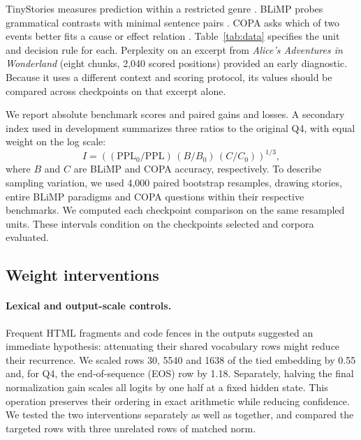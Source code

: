 \documentclass[11pt]{article}
\newcommand{\ppl}{\mathrm{PPL}}
\begin{document}
TinyStories measures prediction within a restricted genre \citep{tiny}. BLiMP probes grammatical contrasts with minimal sentence pairs \citep{blimp}. COPA asks which of two events better fits a cause or effect relation \citep{copa}. Table~\ref{tab:data} specifies the unit and decision rule for each. Perplexity on an excerpt from \emph{Alice's Adventures in Wonderland} (eight chunks, 2,040 scored positions) provided an early diagnostic. Because it uses a different context and scoring protocol, its values should be compared across checkpoints on that excerpt alone.

We report absolute benchmark scores and paired gains and losses. A secondary index used in development summarizes three ratios to the original Q4, with equal weight on the log scale:
\begin{equation}
 I=\left((\ppl_0/\ppl)\,(B/B_0)\,(C/C_0)\right)^{1/3},
 \label{eq:index}
\end{equation}
where $B$ and $C$ are BLiMP and COPA accuracy, respectively. To describe sampling variation, we used 4,000 paired bootstrap resamples, drawing stories, entire BLiMP paradigms and COPA questions within their respective benchmarks. We computed each checkpoint comparison on the same resampled units. These intervals condition on the checkpoints selected and corpora evaluated.

\subsection{Weight interventions}
\paragraph{Lexical and output-scale controls.}
Frequent HTML fragments and code fences in the outputs suggested an immediate hypothesis: attenuating their shared vocabulary rows might reduce their recurrence. We scaled rows 30, 5540 and 1638 of the tied embedding by 0.55 and, for Q4, the end-of-sequence (EOS) row by 1.18. Separately, halving the final normalization gain scales all logits by one half at a fixed hidden state. This operation preserves their ordering in exact arithmetic while reducing confidence. We tested the two interventions separately as well as together, and compared the targeted rows with three unrelated rows of matched norm.
\end{document}

